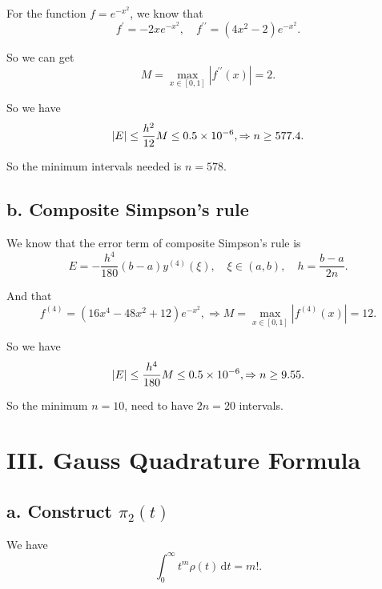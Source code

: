 \documentclass[a4paper]{article}
\begin{document}
For the function $f = e^{-x^2}$, we know that 
\begin{equation}
    f^{\prime} = -2x e^{-x^2}, \quad f^{\prime \prime} = (4x^2 - 2) e^{-x^2}.
\end{equation}

So we can get 
\begin{equation}
    M = \max_{x \in [0, 1]} |f^{\prime \prime} (x)| = 2. 
\end{equation}

So we have 
\begin{equation}
    \abs{E} \leq \frac{h^2}{12} M \leq 0.5 \times 10^{-6}, \Rightarrow n \geq 577.4. 
\end{equation}

So the minimum intervals needed is $n = 578$.

\subsection*{b. Composite Simpson's rule}

We know that the error term of composite Simpson's rule is
\begin{equation}
    E = -\frac{h^4}{180}(b-a) y^{(4)} (\xi), \quad \xi \in (a, b), \quad h = \frac{b-a}{2n}.
\end{equation}

And that 
\begin{equation}
    f^{(4)} = (16x^4 - 48x^2 + 12) e^{-x^2}, \Rightarrow M = \max_{x \in [0, 1]} |f^{(4)} (x)| = 12.
\end{equation}

So we have
\begin{equation}
    \abs{E} \leq \frac{h^4}{180} M \leq 0.5 \times 10^{-6}, \Rightarrow n \geq 9.55.
\end{equation}

So the minimum $n = 10$, need to have $2n = 20$ intervals. 


\section*{III. Gauss Quadrature Formula}

\subsection*{a. Construct $\pi_2(t)$}

We have 
\begin{equation}
    \int_{0}^{\infty} t^m \rho(t) \,\mathrm{d}t = m!. 
\end{equation}
\end{document}
